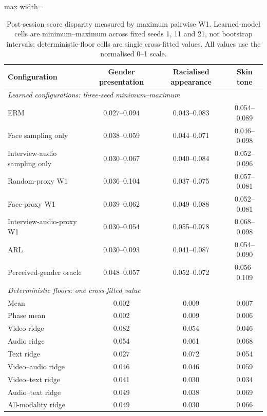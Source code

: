 \begin{table}[htbp]
\centering
\caption[Post-session predicted-score disparity across perceived groups]{Post-session score disparity measured by maximum pairwise W1. Learned-model
cells are minimum--maximum across fixed seeds 1, 11 and 21, not bootstrap intervals;
deterministic-floor cells are single cross-fitted values. All values use the normalised 0--1 scale.}
\label{tab:stage-c-disparity}
\small
\smallskip
\begin{adjustbox}{max width=\textwidth}
\begin{tabular}{lccc}
\toprule
Configuration & Gender presentation & Racialised appearance & Skin tone \\
\midrule
\multicolumn{4}{l}{\textit{Learned configurations: three-seed minimum--maximum}} \\
ERM & 0.027--0.094 & 0.043--0.083 & 0.054--0.089 \\
Face sampling only & 0.038--0.059 & 0.044--0.071 & 0.046--0.098 \\
Interview-audio sampling only & 0.030--0.067 & 0.040--0.084 & 0.052--0.096 \\
Random-proxy W1 & 0.036--0.104 & 0.037--0.075 & 0.057--0.081 \\
Face-proxy W1 & 0.039--0.062 & 0.049--0.088 & 0.052--0.081 \\
Interview-audio-proxy W1 & 0.030--0.054 & 0.055--0.078 & 0.068--0.098 \\
ARL & 0.030--0.093 & 0.041--0.087 & 0.054--0.090 \\
Perceived-gender oracle & 0.048--0.057 & 0.052--0.072 & 0.056--0.109 \\
\midrule
\multicolumn{4}{l}{\textit{Deterministic floors: one cross-fitted value}} \\
Mean & 0.002 & 0.009 & 0.007 \\
Phase mean & 0.002 & 0.009 & 0.006 \\
Video ridge & 0.082 & 0.054 & 0.046 \\
Audio ridge & 0.054 & 0.061 & 0.068 \\
Text ridge & 0.027 & 0.072 & 0.054 \\
Video--audio ridge & 0.046 & 0.046 & 0.059 \\
Video--text ridge & 0.041 & 0.030 & 0.034 \\
Audio--text ridge & 0.049 & 0.038 & 0.069 \\
All-modality ridge & 0.049 & 0.030 & 0.066 \\
\bottomrule
\end{tabular}
\end{adjustbox}
\end{table}
\FloatBarrier

